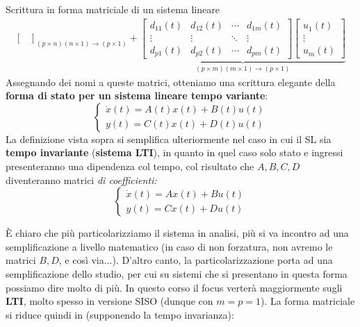 \documentclass[a4paper]{report}
\begin{document}
\begin{defin}{Scrittura in forma matriciale di un sistema lineare}{}
\begin{align}
{\begin{bmatrix}
		\end{bmatrix}}_{(p \times n)(n\times 1) \rightarrow (p\times 1)} + \underbrace{\begin{bmatrix}
			d_{11}(t) & d_{12}(t) & \cdots &d_{1m}(t) \\
			\vdots & \vdots & \ddots & \vdots \\
			d_{p1}(t) & d_{p2}(t) & \cdots &d_{pm}(t)
		\end{bmatrix} \begin{bmatrix}
			u_1(t) \\ \vdots \\ u_m(t)
		\end{bmatrix}}_{(p \times m)(m\times 1) \rightarrow (p\times 1)}
	\end{align}
	Assegnando dei nomi a queste matrici, otteniamo una scrittura elegante della \textbf{forma di stato per un sistema lineare tempo variante}:
	\begin{equation}
		\begin{cases}
			\dot x(t) = A(t)x(t) + B(t)u(t) \\
			y(t) = C(t)x(t) + D(t)u(t)
		\end{cases}
	\end{equation}
	La definizione vista sopra si semplifica ulteriormente nel caso in cui il SL sia \textbf{tempo invariante} (\textbf{sistema LTI}), in quanto in quel caso solo stato e ingressi presenteranno una dipendenza col tempo, col risultato che $A,B,C,D$ diventeranno matrici \textit{di coefficienti:}
\begin{equation}
		\begin{cases}
			\dot x(t) = Ax(t) + Bu(t) \\
			y(t) = Cx(t) + Du(t)
		\end{cases}
\end{equation}
\end{defin}
È chiaro che più particolarizziamo il sistema in analisi, più si va incontro ad una semplificazione a livello matematico (in caso di non forzatura, non avremo le matrici $B,D$, e così via...). D'altro canto, la particolarizzazione porta ad una semplificazione dello studio, per cui su sistemi che si presentano in questa forma possiamo dire molto di più. 
\bb
In questo corso il focus verterà maggiormente sugli \textbf{LTI}, molto spesso in versione SISO (dunque con $m=p=1$). La forma matriciale si riduce quindi in (supponendo la tempo invarianza):
\end{document}
